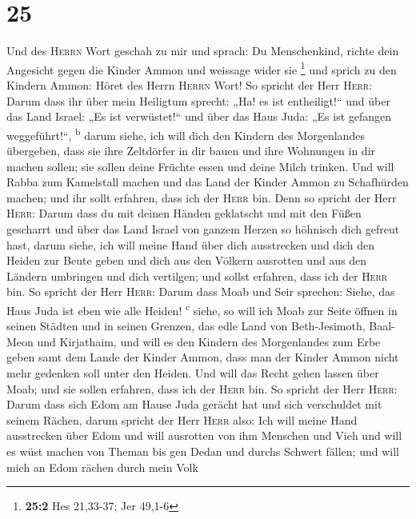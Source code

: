 \hypertarget{section-24}{%
\section{25}\label{section-24}}

 Und des \textsc{Herrn} Wort geschah zu mir und sprach:
 Du Menschenkind, richte dein Angesicht gegen die Kinder
Ammon und weissage wider sie \footnote{\textbf{25:2} Hes 21,33-37; Jer
  49,1-6}  und sprich zu den Kindern Ammon: Höret des
Herrn \textsc{Herrn} Wort! So spricht der Herr \textsc{Herr}: Darum dass
ihr über mein Heiligtum sprecht: „Ha! es ist entheiligt!{}`` und über
das Land Israel: „Es ist verwüstet!{}`` und über das Haus Juda: „Es ist
gefangen weggeführt!{}``, \textsuperscript{b}  darum
siehe, ich will dich den Kindern des Morgenlandes übergeben, dass sie
ihre Zeltdörfer in dir bauen und ihre Wohnungen in dir machen sollen;
sie sollen deine Früchte essen und deine Milch trinken. 
Und will Rabba zum Kamelstall machen und das Land der Kinder Ammon zu
Schafhürden machen; und ihr sollt erfahren, dass ich der \textsc{Herr}
bin.  Denn so spricht der Herr \textsc{Herr}: Darum dass
du mit deinen Händen geklatscht und mit den Füßen gescharrt und über das
Land Israel von ganzem Herzen so höhnisch dich gefreut hast,
 darum siehe, ich will meine Hand über dich ausstrecken
und dich den Heiden zur Beute geben und dich aus den Völkern ausrotten
und aus den Ländern umbringen und dich vertilgen; und sollst erfahren,
dass ich der \textsc{Herr} bin.  So spricht der Herr
\textsc{Herr}: Darum dass Moab und Seir sprechen: Siehe, das Haus Juda
ist eben wie alle Heiden! \textsuperscript{c}  siehe, so
will ich Moab zur Seite öffnen in seinen Städten und in seinen Grenzen,
das edle Land von Beth-Jesimoth, Baal-Meon und Kirjathaim,
 und will es den Kindern des Morgenlandes zum Erbe geben
samt dem Lande der Kinder Ammon, dass man der Kinder Ammon nicht mehr
gedenken soll unter den Heiden.  Und will das Recht gehen
lassen über Moab; und sie sollen erfahren, dass ich der \textsc{Herr}
bin.  So spricht der Herr \textsc{Herr}: Darum dass sich
Edom am Hause Juda gerächt hat und sich verschuldet mit seinem Rächen,
 darum spricht der Herr \textsc{Herr} also: Ich will
meine Hand ausstrecken über Edom und will ausrotten von ihm Menschen und
Vieh und will es wüst machen von Theman bis gen Dedan und durchs Schwert
fällen;  und will mich an Edom rächen durch mein Volk
